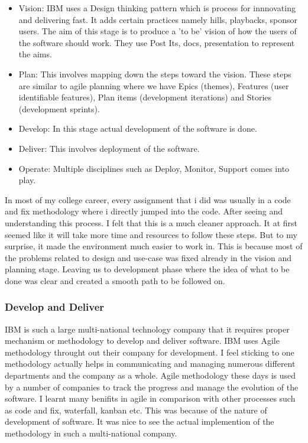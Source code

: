 \begin{itemize}
    \item Vision: IBM uses a Design thinking pattern which is process for innnovating and delivering fast. It adds certain practices namely hills, playbacks, sponsor users. The aim of this stage is to produce a 'to be' vision of how the users of the software should work. They use Post Its, docs, presentation to represent the aims. 
    \item Plan: This involves mapping down the steps toward the vision. These steps are similar to agile planning where we have Epics (themes), Features (user identifiable features), Plan items (development iterations) and Stories (development sprints).
    \item Develop: In this stage actual development of the software is done.
    \item Deliver: This involves deployment of the software.
    \item Operate: Multiple disciplines such as Deploy, Monitor, Support comes into play.
\end{itemize}

In most of my college career, every assignment that i did was usually in a code and fix methodology where i directly jumped into the code. After seeing and understanding this process. I felt that this is a much cleaner approach. It at first seemed like it will take more time and resources to follow these steps. But to my surprise, it made the environment much easier to work in. This is because most of the problems related to design and use-case was fixed already in the vision and planning stage. Leaving us to development phase where the idea of what to be done was clear and created a smooth path to be followed on.

\subsubsection{Develop and Deliver}

IBM is such a large multi-national technology company that it requires proper mechanism or methodology to develop and deliver software. IBM uses Agile methodology throught out their company for development. I feel sticking to one methodology actually helps in communicating and managing numerous different departments and the company as a whole. Agile methodology these days is used by a number of companies to track the progress and manage the evolution of the software. I learnt many benifits in agile in comparison with other processes such as code and fix, waterfall, kanban etc. This was because of the nature of development of software. It was nice to see the actual implemention of the methodology in such a multi-national company. 


